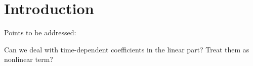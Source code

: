 
\section{Introduction}

{\alert Points to be addressed:

\bi
\item Can we deal with time-dependent coefficients in the linear part? Treat them as nonlinear term? 
\ei
}